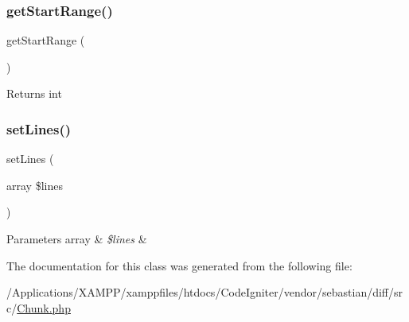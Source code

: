 \subsubsection{\texorpdfstring{get\+Start\+Range()}{getStartRange()}}
{\footnotesize\ttfamily get\+Start\+Range (\begin{DoxyParamCaption}{ }\end{DoxyParamCaption})}

\begin{DoxyReturn}{Returns}
int 
\end{DoxyReturn}
\mbox{\label{class_sebastian_bergmann_1_1_diff_1_1_chunk_a2dbb7ff411eebe139624f2832f334bf0}} 
\subsubsection{\texorpdfstring{set\+Lines()}{setLines()}}
{\footnotesize\ttfamily set\+Lines (\begin{DoxyParamCaption}\item[{array}]{\$lines }\end{DoxyParamCaption})}


\begin{DoxyParams}[1]{Parameters}
array & {\em \$lines} & \\
\hline
\end{DoxyParams}


The documentation for this class was generated from the following file\+:\begin{DoxyCompactItemize}
\item 
/\+Applications/\+X\+A\+M\+P\+P/xamppfiles/htdocs/\+Code\+Igniter/vendor/sebastian/diff/src/\mbox{\hyperlink{_chunk_8php}{Chunk.\+php}}\end{DoxyCompactItemize}
